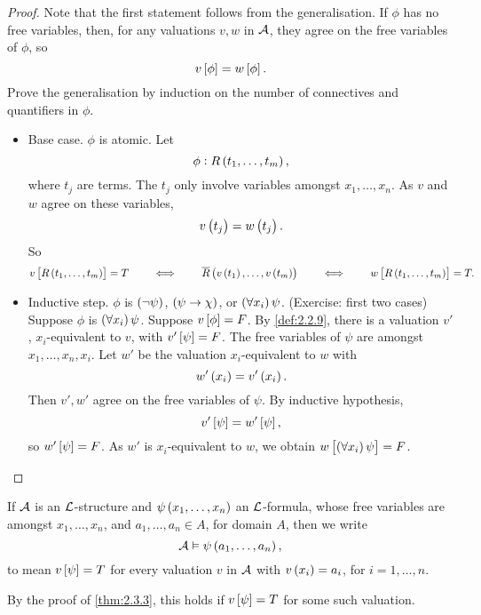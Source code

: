 \begin{proof}
Note that the first statement follows from the generalisation. If $ \phi $ has no free variables, then, for any valuations $ v, w $ in $ \AA $, they agree on the free variables of $ \phi $, so
$$ v\sbr{\phi} = w\sbr{\phi}. $$
Prove the generalisation by induction on the number of connectives and quantifiers in $ \phi $.
\begin{itemize}
\item Base case. $ \phi $ is atomic. Let
$$ \phi : R\br{t_1, \dots, t_m}, $$
where $ t_j $ are terms. The $ t_j $ only involve variables amongst $ x_1, \dots, x_n $. As $ v $ and $ w $ agree on these variables,
$$ v\br{t_j} = w\br{t_j}. $$
So
$$ v\sbr{R\br{t_1, \dots, t_m}} = T \qquad \iff \qquad \overline{R}\br{v\br{t_1}, \dots, v\br{t_m}} \qquad \iff \qquad w\sbr{R\br{t_1, \dots, t_m}} = T. $$
\item Inductive step. $ \phi $ is $ \notb{\psi} $, $ \impb{\psi}{\chi} $, or $ \fab{x_i}\psi $. (Exercise: first two cases) Suppose $ \phi $ is $ \fab{x_i}\psi $. Suppose $ v\sbr{\phi} = F $. By \ref{def:2.2.9}, there is a valuation $ v' $, $ x_i $-equivalent to $ v $, with $ v'\sbr{\psi} = F $. The free variables of $ \psi $ are amongst $ x_1, \dots, x_n, x_i $. Let $ w' $ be the valuation $ x_i $-equivalent to $ w $ with
$$ w'\br{x_i} = v'\br{x_i}. $$
Then $ v', w' $ agree on the free variables of $ \psi $. By inductive hypothesis,
$$ v'\sbr{\psi} = w'\sbr{\psi}, $$
so $ w'\sbr{\psi} = F $. As $ w' $ is $ x_i $-equivalent to $ w $, we obtain $ w\sbr{\fab{x_i}\psi} = F $.
\end{itemize}
\end{proof}


\begin{remark}
If $ \AA $ is an $ \LL $-structure and $ \psi\br{x_1, \dots, x_n} $ an $ \LL $-formula, whose free variables are amongst $ x_1, \dots, x_n $, and $ a_1, \dots, a_n \in A $, for domain $ A $, then we write
$$ \AA \vDash \psi\br{a_1, \dots, a_n}, $$
to mean $ v\sbr{\psi} = T $ for every valuation $ v $ in $ \AA $ with $ v\br{x_i} = a_i $, for $ i = 1, \dots, n $.
\end{remark}

\begin{remark*}
By the proof of \ref{thm:2.3.3}, this holds if $ v\sbr{\psi} = T $ for some such valuation.
\end{remark*}

